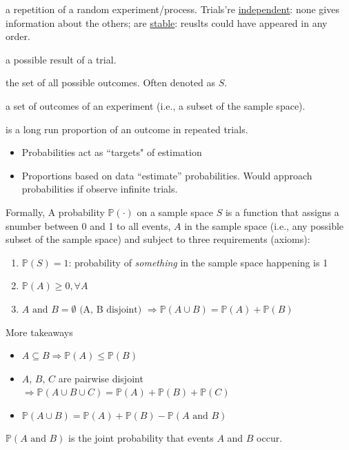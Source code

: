 \documentclass[10pt,landscape]{article}
\newcommand{\Blue}[1]{\noindent{\textbf{\textcolor{Blue}{#1 -}}}}
\newcommand{\Red}[1]{\noindent{\textbf{\textcolor{BrickRed}{#1 -}}}}
\begin{document}
\begin{multicols}{4}
\Blue{Trial} a repetition of a random experiment/process. Trials're \underline{independent}: none gives information about the
others; are \underline{stable}: reuslts could have appeared in any order.

\Blue{Outcome} a possible result of a trial.

\Blue{Sample space} the set of all possible outcomes. Often denoted as $S$.

\Blue{Event} a set of outcomes of an experiment (i.e., a subset of the sample space).

\Red{Probability} is a long run proportion of an outcome in repeated trials.
\begin{itemize}
    \item Probabilities act as ``targets" of estimation
    \item Proportions based on data ``estimate'' probabilities. Would approach probabilities if observe infinite trials.
\end{itemize}
Formally, 
A probability $\mathbb{P}(\cdot)$ on a sample space $S$ is a function that assigns a snumber between 0 and 1 to all
events, $A$ in the sample space (i.e., any possible subset of the sample space) and subject to three requirements
(axioms):
\begin{enumerate}
    \item $\mathbb{P}(S) = 1$: probability of \textit{something} in the sample space happening is 1
    \item $\mathbb{P}(A) \ge 0, \forall A$
    \item $A \text{ and } B = \emptyset \text{ (A, B disjoint) } \Rightarrow \mathbb{P}(A \cup B) = \mathbb{P}(A) + \mathbb{P}(B)$
\end{enumerate}

More takeaways
\begin{itemize}
    \item $A \subseteq B \Rightarrow \mathbb{P}(A) \le \mathbb{P}(B)$
    \item $A$, $B$, $C$ are pairwise disjoint $\Rightarrow \mathbb{P}(A \cup B \cup C) = \mathbb{P}(A) + \mathbb{P}(B) + \mathbb{P}(C)$
    \item $\mathbb{P}(A \cup B) = \mathbb{P}(A) + \mathbb{P}(B) - \mathbb{P}(A \text{ and } B)$
\end{itemize}

\Red{Joint Probability} $\mathbb{P}(A \text{ and } B)$ is the joint probability that events $A$ and $B$ occur.


\end{multicols}
\end{document}
